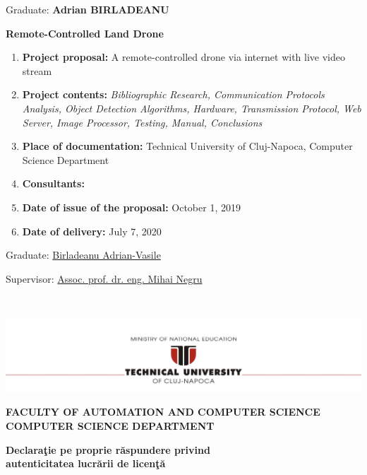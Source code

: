 \documentclass[12pt,a4paper,twoside]{report}
\renewcommand{\thesisauthor}{Adrian BIRLADEANU}    %
\renewcommand{\thesistitle}{Remote-Controlled Land Drone}
\newcommand{\department}{\bf FACULTY OF AUTOMATION AND COMPUTER SCIENCE\\
COMPUTER SCIENCE DEPARTMENT}
\newcommand{\utcnlogo}{\includegraphics[width=15cm]{img/tucn.jpg}}
\begin{document}
\vspace{2cm}

\begin{center}
Graduate: {\bf \thesisauthor}

\vspace{1cm}

{\bf \thesistitle}
\end{center}

\vspace{1cm}

\begin{enumerate}
 \item {\bf Project proposal:} A remote-controlled drone via internet with live video stream
\item {\bf Project contents:} \textit{Bibliographic Research, Communication Protocols Analysis, Object Detection Algorithms, Hardware, Transmission Protocol, Web Server, Image Processor, Testing, Manual, Conclusions}
\item {\bf Place of documentation:} Technical University of Cluj-Napoca, Computer Science Department
\item {\bf Consultants:}
\item {\bf Date of issue of the proposal:} October 1, 2019
\item {\bf Date of  delivery:} July 7, 2020
  \end{enumerate}
\vspace{1.2cm}

\hspace{6cm} Graduate: \underline{Birladeanu Adrian-Vasile} 

\vspace{0.5cm}
\hspace{6cm} Supervisor: \underline{Assoc. prof. dr. eng. Mihai Negru}

\thispagestyle{empty}


\newpage
$ $


\thispagestyle{empty}
\newpage

\begin{center}
\utcnlogo

\department
\end{center}

\vspace{0.5cm}

\begin{center}
{\bf
Declara\c{t}ie pe proprie r\u{a}spundere privind\\ 
autenticitatea lucr\u{a}rii de licen\c{t}\u{a}}
\end{center}
\vspace{1cm}
\end{document}
